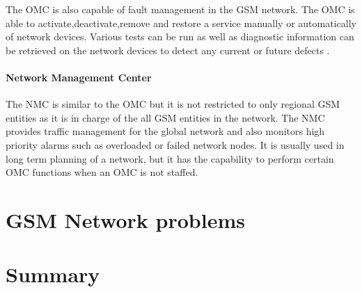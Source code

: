 The OMC is also capable of fault management in the GSM network. The OMC is able to activate,deactivate,remove and restore a service manually or automatically of network devices. Various tests can be run as well as diagnostic information can be retrieved on the network devices to detect any current or future defects \cite{GSMSysEngin}.

\paragraph{Network Management Center}
The NMC is similar to the OMC but it is not restricted to only regional GSM entities as it is in charge of the all GSM entities in the network. The NMC provides traffic management for the global network and also monitors high priority alarms such as overloaded or failed network nodes. It is usually used in long term planning of a network, but it has the capability to perform certain OMC functions when an OMC is not staffed. 

\section{GSM Network problems}
\section{Summary}
